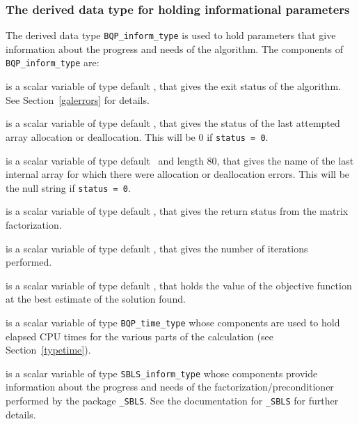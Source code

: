 \documentclass{galahad}
\newcommand{\packagename}{BQP}
\begin{document}

\subsubsection{The derived data type for holding informational
 parameters}\label{typeinform}
The derived data type 
{\tt \packagename\_inform\_type} 
is used to hold parameters that give information about the progress and needs 
of the algorithm. The components of 
{\tt \packagename\_inform\_type} 
are:

\begin{description}

 is a scalar variable of type default \integer, that gives the
exit status of the algorithm. 
See Section~\ref{galerrors} 
for details.

 is a scalar variable of type default \integer, that gives
the status of the last attempted array allocation or deallocation.
This will be 0 if {\tt status = 0}.

 is a scalar variable of type default \character\
and length 80, that  gives the name of the last internal array 
for which there were allocation or deallocation errors.
This will be the null string if {\tt status = 0}. 

 is a scalar variable of type default \integer, that 
gives the return status from the matrix factorization.

 is a scalar variable of type default \integer, that 
gives the number of iterations performed.

 is a scalar variable of type default \realdp, that holds the
value of the objective function at the best estimate of the solution found.

 is a scalar variable of type {\tt \packagename\_time\_type} 
whose components are used to hold elapsed CPU times for the various parts 
of the calculation (see Section~\ref{typetime}).

 is a scalar variable of type 
{\tt SBLS\_inform\_type} %
whose components provide information about the progress and needs
of the factorization/preconditioner 
performed by the package 
{\tt \libraryname\_SBLS}. 
See the documentation for {\tt \libraryname\_SBLS} for further details.

\end{description}
\end{document}
